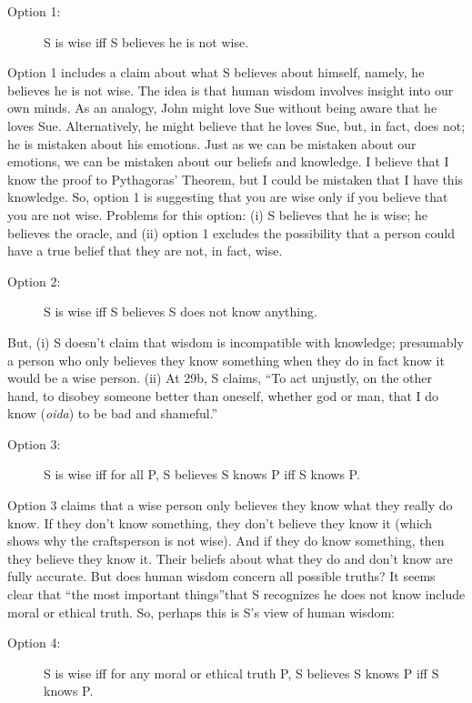 \documentclass[oneside]{article}
\begin{document}
\begin{description}
\begin{description}
\item[Option 1:] S is wise iff S believes he is not wise.
\end{description}
Option 1 includes a claim about what S believes about himself, namely, he believes he is not wise. The idea is that human wisdom involves insight into our own minds. As an analogy, John might love Sue without being aware that he loves Sue. Alternatively, he might believe that he loves Sue, but, in fact, does not; he is mistaken about his emotions. Just as we can be mistaken about our emotions, we can be mistaken about our beliefs and knowledge. I believe that I know the proof to Pythagoras' Theorem, but I could be mistaken that I have this knowledge. So, option 1 is suggesting that you are wise only if you believe that you are not wise. 
Problems for this option:  (i) S believes that he is wise; he believes the oracle, and (ii) option 1 excludes the possibility that a person could have a true belief that they are not, in fact, wise. 
\begin{description}
\item[Option 2:] S is wise iff S believes S does not know anything.
\end{description}
But, (i) S doesn't claim that wisdom is incompatible with knowledge; presumably a person who only believes they know something when they do in fact know it would be a wise person. (ii) At 29b, S claims, ``To act unjustly, on the other hand, to disobey someone better than oneself, whether god or man, that I do know (\emph{oida}) to be bad and shameful.''  
\begin{description}
\item[Option 3:] S is wise iff for all P, S believes S knows P iff S knows P.
\end{description}
Option 3 claims that a wise person only believes they know what they really do know. If they don't know something, they don't believe they know it (which shows why the craftsperson is not wise). And if they do know something, then they believe they know it. Their beliefs about what they do and don't know are fully accurate. But does human wisdom concern all possible truths? It seems clear that ``the most important things''that S recognizes he does not know include moral or ethical truth. So, perhaps this is S's view of human wisdom: 
\begin{description}
\item[Option 4:] S is wise iff for any moral or ethical truth P, S believes S knows P iff S knows P.
\end{description}


\end{description}
\end{document}
